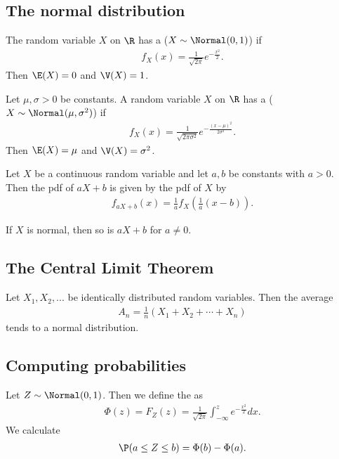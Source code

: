 \documentclass{article}
\begin{document}
\subsection{The normal distribution}
\begin{definition}
    The random variable $X$ on $\R$ has a 
    ($X\sim\Normal(0,1)$) if 
    \begin{align*}
        f_X(x)=\frac{1}{\sqrt{2\pi}}e^{-\frac{x^2}{2}}.
    \end{align*}
    Then $\E(X)=0$ and $\V(X)=1$.
\end{definition}
\begin{definition}
    Let $\mu,\sigma>0$ be constants. A random variable $X$ on $\R$ has
    a 
    ($X\sim\Normal(\mu,\sigma^2)$) if
    \begin{align*}
        f_X(x) =\frac{1}{\sqrt{2\pi\sigma^2}}e^{-\frac{(x-\mu)^2}{2\sigma^2 }}.
    \end{align*}
    Then $\E(X)=\mu$ and $\V(X)=\sigma^2$.
\end{definition}
\begin{proposition}
    Let $X$ be a continuous random variable and let $a,b$ be constants
    with $a>0$. Then the pdf of $aX+b$ is given by the pdf of $X$ by
    \begin{align*}
        f_{aX+b}(x)=\frac{1}{a}f_X\left(\frac{1}{a}(x-b)\right).
    \end{align*}
\end{proposition}
\begin{theorem}
       If $X$ is normal, then so is $aX+b$ for $a\not=0$.
\end{theorem}


\subsection{The Central Limit Theorem}


\begin{theorem}
    Let $X_1,X_2,...$ be identically distributed random variables.
    Then the average
    \begin{align*}
        A_n=\frac{1}{n}\left(X_1+X_2+\cdots+X_n\right)
    \end{align*}
    tends to a normal distribution.
\end{theorem}


\subsection{Computing probabilities}


\begin{definition}
    Let $Z\sim\Normal(0,1)$. Then we define the  as
    \begin{align*}
        \Phi(z)=F_Z(z) = \frac{1}{\sqrt{2\pi}}\int_{-\infty}^z e^{-\frac{x^2}{2}}dx. 
    \end{align*}
    We calculate
    \begin{align*}
        \P(a\leq Z\leq b) = \Phi(b)-\Phi(a).
    \end{align*}
\end{definition}
\end{document}
